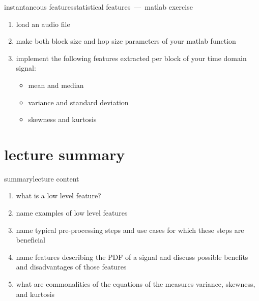 		\begin{frame}{instantaneous features}{statistical features~---~matlab exercise}
            \begin{enumerate}
                \item   load an audio file
                \item   make both block size and hop size parameters of your matlab function
                \item   implement the following features extracted per block of your time domain signal:
                    \begin{itemize}
                        \item   mean and median
                        \item   variance and standard deviation
                        \item   skewness and kurtosis
                    \end{itemize}
            \end{enumerate}
		\end{frame}

    \section[summary]{lecture summary}
        \begin{frame}{summary}{lecture content}
            \begin{enumerate}
                \item       what is a low level feature? 
                \smallskip
                \item<2->   name examples of low level features
                \smallskip
                \item<3->   name typical pre-processing steps and use cases for which these steps are beneficial
                \smallskip
                \item<4->   name features describing the PDF of a signal and discuss possible benefits and disadvantages of those features
                \smallskip
                \item<5->   what are commonalities of the equations of the measures variance, skewness, and kurtosis
            \end{enumerate}
        \end{frame}


